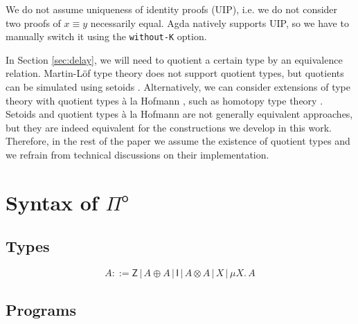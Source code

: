 \documentclass[runningheads,a4paper]{llncs}
\newcommand{\Pio}{\ensuremath{\mathsf{\Pi}^{\mathsf{o}}}}
\newcommand{\Ty}{\mathsf{Ty}}
\newcommand{\Var}{\mathsf{Var}}
\newcommand{\Z}{\mathsf{Z}}
\newcommand{\I}{\mathsf{I}}
\begin{document}
We do not assume uniqueness of identity proofs
(UIP), i.e. we do not consider two proofs of $x \equiv y$ necessarily
equal. Agda natively supports UIP, so we have to manually switch it
using the \verb|without-K| option.

In Section \ref{sec:delay}, we will need to quotient a certain type by
an equivalence relation. Martin-L\"of type theory does not support
quotient types, but quotients can be simulated using setoids
\cite{BartheCP03}. Alternatively, we can consider extensions of type theory with
quotient types \`a la Hofmann \cite{Hofmann}, such as homotopy type
theory \cite{Hott}. Setoids and quotient types \`a la
Hofmann are not generally equivalent approaches, but they are indeed
equivalent for the constructions we develop in this work. Therefore,
in the rest of the paper we assume the existence of quotient types and
we refrain from technical discussions on their implementation.


\section{Syntax of \Pio}\label{sec:syntax}

\subsection{Types}

\[
A ::= \Z \, | \,A \oplus A \, | \,\I \,| \,A \otimes A \,| \,X \,|
\,\mu X.\,A 
\]


\subsection{Programs}
\end{document}
